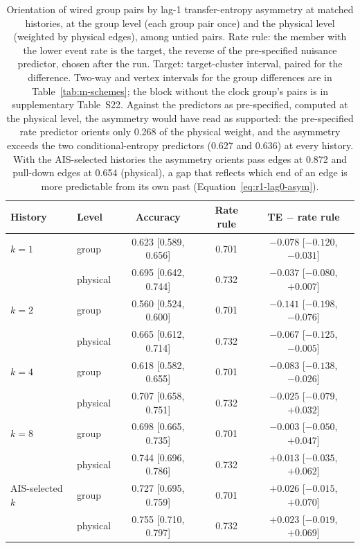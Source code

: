 \begin{table}[tbp]
  \centering
  \footnotesize
  \caption[Orientation of wired pairs against the event-rate rule]{Orientation of wired group pairs by lag-1 transfer-entropy asymmetry at matched histories, at the group level (each group pair once) and the physical level (weighted by physical edges), among untied pairs. Rate rule: the member with the lower event rate is the target, the reverse of the pre-specified nuisance predictor, chosen after the run. Target: target-cluster interval, paired for the difference. Two-way and vertex intervals for the group differences are in Table~\ref{tab:m-schemes}; the block without the clock group's pairs is in supplementary Table~S22. Against the predictors as pre-specified, computed at the physical level, the asymmetry would have read as supported: the pre-specified rate predictor orients only 0.268 of the physical weight, and the asymmetry exceeds the two conditional-entropy predictors (0.627 and 0.636) at every history. With the AIS-selected histories the asymmetry orients pass edges at 0.872 and pull-down edges at 0.654 (physical), a gap that reflects which end of an edge is more predictable from its own past (Equation~\eqref{eq:r1-lag0-asym}).}
  \label{tab:direction}
  \begin{tabular}{@{}llccc@{}}
    \toprule
    History & Level & Accuracy & Rate rule & TE $-$ rate rule \\
    \midrule
$k = 1$ & group & 0.623 [0.589, 0.656] & 0.701 & $-0.078$ [$-0.120$, $-0.031$] \\
 & physical & 0.695 [0.642, 0.744] & 0.732 & $-0.037$ [$-0.080$, $+0.007$] \\
\addlinespace
$k = 2$ & group & 0.560 [0.524, 0.600] & 0.701 & $-0.141$ [$-0.198$, $-0.076$] \\
 & physical & 0.665 [0.612, 0.714] & 0.732 & $-0.067$ [$-0.125$, $-0.005$] \\
\addlinespace
$k = 4$ & group & 0.618 [0.582, 0.655] & 0.701 & $-0.083$ [$-0.138$, $-0.026$] \\
 & physical & 0.707 [0.658, 0.751] & 0.732 & $-0.025$ [$-0.079$, $+0.032$] \\
\addlinespace
$k = 8$ & group & 0.698 [0.665, 0.735] & 0.701 & $-0.003$ [$-0.050$, $+0.047$] \\
 & physical & 0.744 [0.696, 0.786] & 0.732 & $+0.013$ [$-0.035$, $+0.062$] \\
\addlinespace
AIS-selected $k$ & group & 0.727 [0.695, 0.759] & 0.701 & $+0.026$ [$-0.015$, $+0.070$] \\
 & physical & 0.755 [0.710, 0.797] & 0.732 & $+0.023$ [$-0.019$, $+0.069$] \\
    \bottomrule
  \end{tabular}
\end{table}

